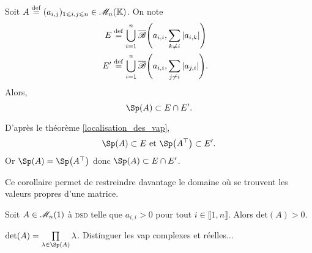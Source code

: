 \begin{corol}
    Soit $A \overset{\mathrm{\tiny def}}{=} (a_{i,j})_{1 \leqslant i, j \leqslant n} \in \mathscr{M}_n(\mathbb{K})$. On note
    \begin{align*}
        E &\overset{\mathrm{\tiny def}}{=} \bigcup\limits_{i=1}^{n} \overline{\mathscr{B}} \Bigg( a_{i,i}, \sum\limits_{k \not = i} |a_{i,k}| \Bigg) \quad\\
        E' &\overset{\mathrm{\tiny def}}{=} \bigcup\limits_{i=1}^{n} \overline{\mathscr{B}} \Bigg( a_{i,i}, \sum\limits_{j \not = i} |a_{j, i}| \Bigg).
    \end{align*}
    Alors,
    $$\Sp(A) \subset E \cap E'.$$
\end{corol}

\begin{demo}
    D'après le théorème \ref{localisation_des_vap}, 
    $$\Sp(A) \subset E \text{ et } \Sp \big( \Trsp{A} \big) \subset E'.$$
    Or $\Sp(A) = \Sp \big( \Trsp{A} \big)$ donc $\Sp(A) \subset E \cap E'$.
\end{demo}    

Ce corollaire permet de restreindre davantage le domaine où se trouvent les valeurs propres d'une matrice. 

\begin{prop}
    Soit $A \in \mathscr{M}_n(1)$ à \textsc{dsd} telle que $a_{i,i} > 0$ pour tout $i \in \llbracket 1, n \rrbracket$. Alors $\mathrm{det}(A) > 0$. 
\end{prop}

\begin{demo}
    $\det(A) = \prod\limits_{\lambda \in \Sp(A)} \lambda$. Distinguer les vap complexes et réelles...
\end{demo}
